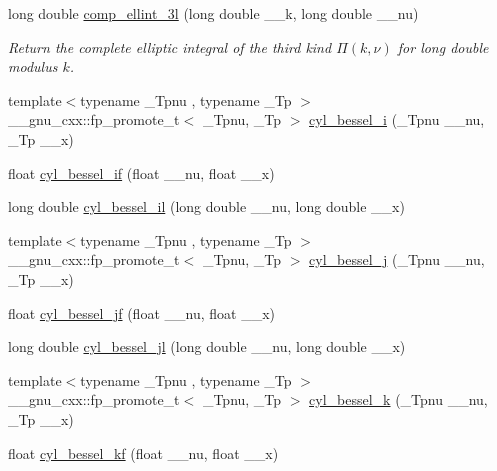 \begin{DoxyCompactItemize}
long double \hyperlink{group__cxx17__math__spec__func_ga1ca081fee102cd0d4d6b091285e495e5}{comp\+\_\+ellint\+\_\+3l} (long double \+\_\+\+\_\+k, long double \+\_\+\+\_\+nu)
\begin{DoxyCompactList}\small\item\em Return the complete elliptic integral of the third kind $ \Pi(k,\nu) $ for {\ttfamily long double} modulus $ k $. \end{DoxyCompactList}\item 
{\footnotesize template$<$typename \+\_\+\+Tpnu , typename \+\_\+\+Tp $>$ }\\\+\_\+\+\_\+gnu\+\_\+cxx\+::fp\+\_\+promote\+\_\+t$<$ \+\_\+\+Tpnu, \+\_\+\+Tp $>$ \hyperlink{group__cxx17__math__spec__func_ga29504b6008798072b0b8d6ea5a50ec60}{cyl\+\_\+bessel\+\_\+i} (\+\_\+\+Tpnu \+\_\+\+\_\+nu, \+\_\+\+Tp \+\_\+\+\_\+x)
\item 
float \hyperlink{group__cxx17__math__spec__func_gaaf738427d4da0bda66bc2274dfb853a7}{cyl\+\_\+bessel\+\_\+if} (float \+\_\+\+\_\+nu, float \+\_\+\+\_\+x)
\item 
long double \hyperlink{group__cxx17__math__spec__func_gab7962629216d03efb8ecaa3f70c6878f}{cyl\+\_\+bessel\+\_\+il} (long double \+\_\+\+\_\+nu, long double \+\_\+\+\_\+x)
\item 
{\footnotesize template$<$typename \+\_\+\+Tpnu , typename \+\_\+\+Tp $>$ }\\\+\_\+\+\_\+gnu\+\_\+cxx\+::fp\+\_\+promote\+\_\+t$<$ \+\_\+\+Tpnu, \+\_\+\+Tp $>$ \hyperlink{group__cxx17__math__spec__func_ga644f7eb975809674db88768f2f115744}{cyl\+\_\+bessel\+\_\+j} (\+\_\+\+Tpnu \+\_\+\+\_\+nu, \+\_\+\+Tp \+\_\+\+\_\+x)
\item 
float \hyperlink{group__cxx17__math__spec__func_ga15731a7bccd6351d28353e3c4c2a2d23}{cyl\+\_\+bessel\+\_\+jf} (float \+\_\+\+\_\+nu, float \+\_\+\+\_\+x)
\item 
long double \hyperlink{group__cxx17__math__spec__func_gade8e94a80520a8b628b2d658755b25c0}{cyl\+\_\+bessel\+\_\+jl} (long double \+\_\+\+\_\+nu, long double \+\_\+\+\_\+x)
\item 
{\footnotesize template$<$typename \+\_\+\+Tpnu , typename \+\_\+\+Tp $>$ }\\\+\_\+\+\_\+gnu\+\_\+cxx\+::fp\+\_\+promote\+\_\+t$<$ \+\_\+\+Tpnu, \+\_\+\+Tp $>$ \hyperlink{group__cxx17__math__spec__func_gac73d664b8e7ceba7f8e786c93e97a084}{cyl\+\_\+bessel\+\_\+k} (\+\_\+\+Tpnu \+\_\+\+\_\+nu, \+\_\+\+Tp \+\_\+\+\_\+x)
\item 
float \hyperlink{group__cxx17__math__spec__func_ga1f50047f9aab0ec8b1a1615fe9fbe32f}{cyl\+\_\+bessel\+\_\+kf} (float \+\_\+\+\_\+nu, float \+\_\+\+\_\+x)

\end{DoxyCompactItemize}
